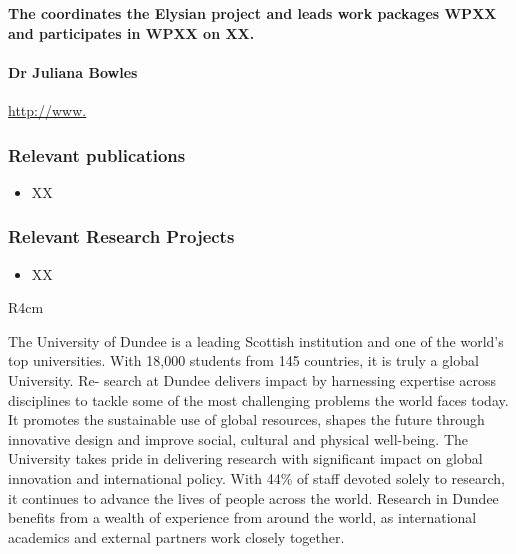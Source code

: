 \documentclass[a4paper,11pt]{article}
\newcommand{\project}[1]{\textbf{#1}\xspace}
\newcommand{\SECURITY}{\project{Elysian}}
\newcommand{\TheProject}{\SECURITY}
\begin{document}
\vspace{10pt}
\textbf{The \SAlong{} coordinates the \TheProject{} project and
leads work packages WPXX and participates in WPXX on XX.}
\vspace{10pt}

\paragraph{Dr Juliana Bowles} \url{http://www.}


\subsubsection*{Relevant publications}
\begin{itemize}
\item XX
\end{itemize}

\pagebreak
\subsubsection*{Relevant Research Projects}

\begin{itemize}
\item XX
\end{itemize}

\begin{wrapfigure}{R}{4cm}
\vspace{-2cm}
\hfill {}
\vspace{-1cm}
\end{wrapfigure}

The University of Dundee is a leading Scottish institution and one of the world’s top universities. With 18,000 students from 145 countries, it is truly a global University. Re-
search at Dundee delivers impact by harnessing expertise across disciplines to tackle some of the most challenging problems the world faces today. It promotes the sustainable use of global resources, shapes the future through innovative design and improve social, cultural and physical well-being. The University takes pride in delivering research with significant impact on global innovation and international policy. With 44\% of staff devoted solely to research, it continues to advance the lives of people across the world. Research in Dundee benefits from a wealth of experience from around the world, as international academics and external partners work closely together.
\end{document}
